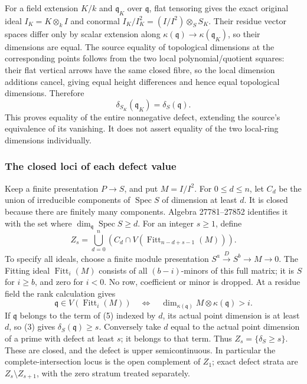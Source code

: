 For a field extension \(K/k\) and \(\mathfrak q_K\) over \(\mathfrak q\), flat tensoring gives the exact original ideal \(I_K=K\otimes_k I\) and conormal \(I_K/I_K^2=(I/I^2)\otimes_S S_K\). Their residue vector spaces differ only by scalar extension along \(\kappa(\mathfrak q)\to\kappa(\mathfrak q_K)\), so their dimensions are equal. The source equality of topological dimensions at the corresponding points follows from the two local polynomial/quotient squares: their flat vertical arrows have the same closed fibre, so the local dimension additions cancel, giving equal height differences and hence equal topological dimensions. Therefore \[
\delta_{S_K}(\mathfrak q_K)=\delta_S(\mathfrak q).\tag{4}
\] This proves equality of the entire nonnegative defect, extending the source's equivalence of its vanishing. It does not assert equality of the two local-ring dimensions individually.

\subsubsection{The closed loci of each defect value}\label{algebra-proof-045-the-closed-loci-of-each-defect-value}

Keep a finite presentation \(P\to S\), and put \(M=I/I^2\). For \(0\leq d\leq n\), let \(C_d\) be the union of irreducible components of \(\operatorname{Spec}S\) of dimension at least \(d\). It is closed because there are finitely many components. Algebra 27781--27852 identifies it with the set where \(\dim_{\mathfrak q}\operatorname{Spec}S\geq d\). For an integer \(s\geq1\), define \[
Z_s=\bigcup_{d=0}^{n}
\left(C_d\cap V(\operatorname{Fitt}_{n-d+s-1}(M))\right).\tag{5}
\] To specify all ideals, choose a finite module presentation \(S^a\xrightarrow D S^b\to M\to0\). The Fitting ideal \(\operatorname{Fitt}_i(M)\) consists of all \((b-i)\)-minors of this full matrix; it is \(S\) for \(i\geq b\), and zero for \(i<0\). No row, coefficient or minor is dropped. At a residue field the rank calculation gives \[
\mathfrak q\in V(\operatorname{Fitt}_i(M))
\quad\Longleftrightarrow\quad
\dim_{\kappa(\mathfrak q)}M\otimes\kappa(\mathfrak q)>i.
\] If \(\mathfrak q\) belongs to the term of (5) indexed by \(d\), its actual point dimension is at least \(d\), so (3) gives \(\delta_S(\mathfrak q)\geq s\). Conversely take \(d\) equal to the actual point dimension of a prime with defect at least \(s\); it belongs to that term. Thus \(Z_s=\{\delta_S\geq s\}\). These are closed, and the defect is upper semicontinuous. In particular the complete-intersection locus is the open complement of \(Z_1\); exact defect strata are \(Z_s\setminus Z_{s+1}\), with the zero stratum treated separately.

